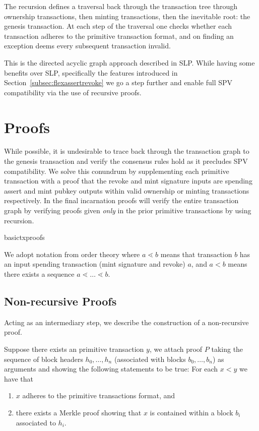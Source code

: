 \documentclass[9pt,oneside]{amsart}
\begin{document}
\begin{multicols}{2}
The recursion defines a traversal back through the transaction tree through ownership transactions, then minting transactions, then the inevitable root: the genesis transaction. At each step of the traversal one checks whether each transaction adheres to the primitive transaction format, and on finding an exception deems every subsequent transaction invalid.

This is the directed acyclic graph approach described in SLP. While having some benefits over SLP, specifically the features introduced in Section~\ref{subsec:flexassertrevoke} we go a step further and enable full SPV compatibility via the use of recursive proofs.
    
\section{Proofs}
While possible, it is undesirable to trace back through the transaction graph to the genesis transaction and verify the consensus rules hold as it precludes SPV compatibility. We solve this conundrum by supplementing each primitive transaction with a proof that the revoke and mint signature inputs are spending assert and mint pubkey outputs within valid ownership or minting transactions respectively. In the final incarnation proofs will verify the entire transaction graph by verifying proofs given \emph{only} in the prior primitive transactions by using recursion.

\begin{center}
    {basictxproofs}
\end{center}

We adopt notation from order theory where $a \lessdot b$ means that transaction $b$ has an input spending transaction (mint signature and revoke) $a$, and $a < b$ means there exists a sequence $a \lessdot \dots \lessdot b$.
\subsection{Non-recursive Proofs}
Acting as an intermediary step, we describe the construction of a non-recursive proof.


Suppose there exists an primitive transaction $y$, we attach proof $P$ taking the sequence of block headers $h_{0}, \dots, h_{n}$ (associated with blocks $b_{0}, \dots, b_{n}$) as arguments and showing the following statements to be true:
For each $x < y$ we have that
\begin{enumerate}
    \item $x$ adheres to the primitive transactions format, and
    \item there exists a Merkle proof showing that $x$ is contained within a block $b_{i}$ associated to $h_{i}$.
\end{enumerate}


\end{multicols}
\end{document}
